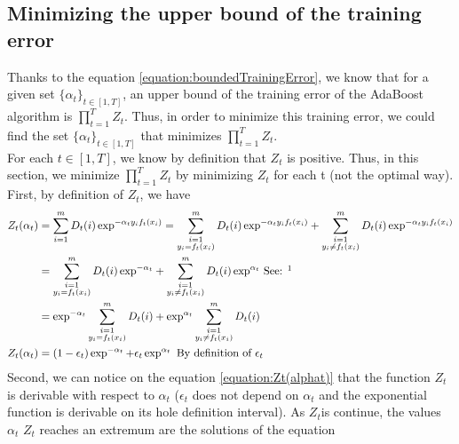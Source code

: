 \documentclass[12pt]{article}											%
\begin{document}
\subsection{Minimizing the upper bound of the training error}
Thanks to the equation \ref{equation:boundedTrainingError}, we know that for a given set $\{\alpha_t\}_{t \in [1, T]}$, an upper bound of the training error of the AdaBoost algorithm is $\prod_{t=1}^{T}{Z_t}$.   Thus, in order to minimize this training error, we could find the set $\{\alpha_t\}_{t \in [1, T]}$ that minimizes $\prod_{t=1}^{T}{Z_t}$.\\
For each $t \in [1, T]$, we know by definition that  $Z_t$ is positive.   Thus, in this section, we minimize $\prod_{t=1}^{T}{Z_t}$ by minimizing $Z_t$ for each t (not the optimal way). \\
First, by definition of $Z_t$, we have 
	\begin{equation}
	\begin{aligned}
    	Z_t(\alpha_t)	&= \sum_{i=1}^{m}{D_t(i)\exp^{-\alpha_t y_i f_t(x_i)}}
        								=  \sum_{\substack{i=1 \\ y_i = f_t(x_i)}}^{m}{D_t(i)\exp^{-\alpha_t y_i f_t(x_i)}}  +  \sum_{\substack{i=1 \\ y_i \neq f_t(x_i)}}^{m}{D_t(i)\exp^{-\alpha_t y_i f_t(x_i)}}\\
        								&=  \sum_{\substack{i=1 \\ y_i = f_t(x_i)}}^{m}{D_t(i)\exp^{-\alpha_t}}  +  \sum_{\substack{i=1 \\ y_i \neq f_t(x_i)}}^{m}{D_t(i)\exp^{\alpha_t}} \mbox{  See: \footnotemark[1]}\\
        								&=  \exp^{-\alpha_t} \sum_{\substack{i=1 \\ y_i = f_t(x_i)}}^{m}{D_t(i)}  +  \exp^{\alpha_t} \sum_{\substack{i=1 \\ y_i \neq f_t(x_i)}}^{m}{D_t(i)} \\
    	Z_t(\alpha_t)	&=  (1 - \epsilon_t) \exp^{-\alpha_t}  + \epsilon_t \exp^{\alpha_t} \mbox{  By definition of  } \epsilon_t \\
     \label{equation:Zt(alphat)}
	\end{aligned}
	\end{equation}
Second, we can notice on the equation \ref{equation:Zt(alphat)} that the function $Z_t$ is derivable with respect to $\alpha_t$ ($\epsilon_t$ does not depend on $\alpha_t$ and the exponential function is derivable on its hole definition interval).   As $Z_t$is continue, the values $\alpha_t$ $Z_t$ reaches an extremum are the solutions of the equation
\end{document}
